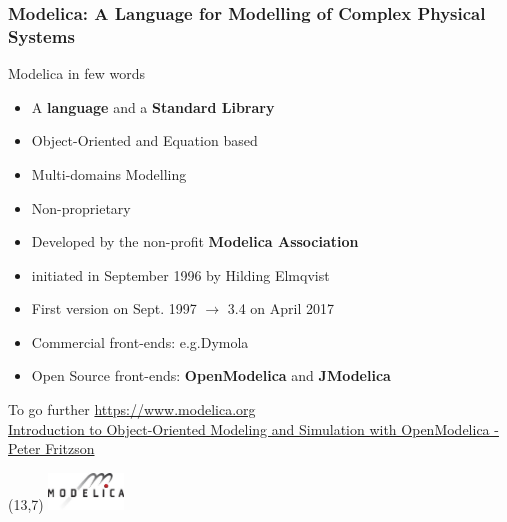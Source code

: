 
\begin{frame}
  \frametitle{Modelica: A Language for Modelling of Complex Physical Systems}
  Modelica in few words
  \begin{itemize}
  \item A \textbf{language} and a \textbf{Standard Library}
  \item Object-Oriented and Equation based
  \item Multi-domains Modelling
  \item Non-proprietary
  \item Developed by the non-profit \textbf{Modelica Association}
  \item initiated in September 1996 by Hilding Elmqvist
  \item First version on Sept. 1997  $\rightarrow$ 3.4 on April 2017
  \item Commercial front-ends: e.g.\@ Dymola
  \item Open Source front-ends: \textbf{OpenModelica} and \textbf{JModelica} \\[1em]
  \end{itemize}
  {\tiny%
    \begin{tabbing}
      To go further \=%
      \url{https://www.modelica.org} \\
      \> \href{https://www.openmodelica.org/images/docs/tutorials/modelicatutorialfritzson.pdf}{
        Introduction to Object-Oriented Modeling and Simulation with OpenModelica - Peter Fritzson}
      \end{tabbing}%
    }
  \begin{textblock}{6}(13,7)
    \includegraphics[width=2cm]{images/modelica-logo.jpg}
  \end{textblock}
\end{frame}

